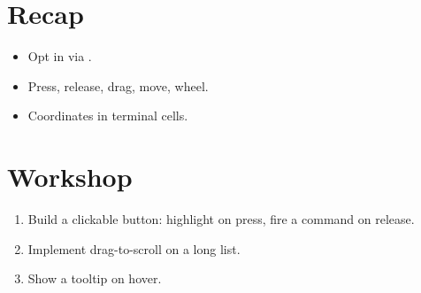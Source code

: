 \section{Recap}

\begin{recap}
\begin{itemize}[leftmargin=*]
  \item Opt in via .
  \item Press, release, drag, move, wheel.
  \item Coordinates in terminal cells.
\end{itemize}
\end{recap}

\section*{Workshop}

\begin{enumerate}[leftmargin=*]
  \item Build a clickable button: highlight on press,
    fire a command on release.
  \item Implement drag-to-scroll on a long list.
  \item Show a tooltip on hover.
\end{enumerate}
